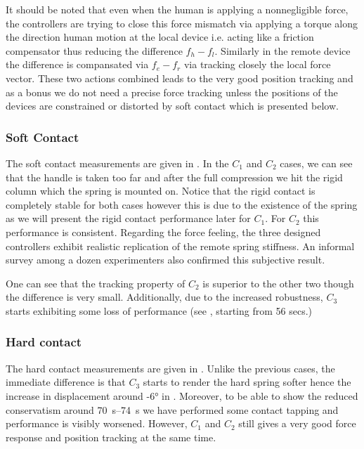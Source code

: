 It should be noted that even when the human is applying a nonnegligible force, the controllers are trying to close this force mismatch 
via applying a torque along the direction human motion at the local device i.e. acting like a friction compensator thus reducing the difference 
$f_h-f_l$. Similarly in the remote device the difference is compansated  via $f_e-f_r$ via tracking closely the local force vector. These two actions 
combined leads to the very good position tracking and as a bonus we do not need a precise force tracking unless the positions of the devices are 
constrained or distorted by soft contact which is presented below.



\subsubsection{Soft Contact}

The soft contact measurements are given in . In the $C_1$ and $C_2$ cases, 
we can see that the handle is taken too far and after the full compression we hit 
the rigid column which the spring is mounted on. Notice that the rigid contact is
completely stable for both cases however this is due to the existence of the spring 
as we will present the rigid contact performance later for $C_1$. For $C_2$ this 
performance is consistent. Regarding the force feeling, the three designed controllers
exhibit realistic replication of the remote spring stiffness. An informal survey among 
a dozen experimenters also confirmed this subjective result. 

One can see that the tracking property of $C_2$ is superior to the other two though the
difference is very small. Additionally, due to the increased robustness, $C_3$ starts
exhibiting some loss of performance (see , starting from 56 secs.)

\subsubsection{Hard contact}

The hard contact measurements are given in . Unlike the 
previous cases, the immediate difference is that $C_3$ starts to render the hard spring softer hence the increase in
displacement around \ang{-6} in . Moreover, to be able to show the reduced conservatism around 
\SIrange{70}{74}{\second} we have performed some contact tapping and performance is visibly worsened. However, $C_1$ and $C_2$ 
still gives a very good force response and position tracking at the same time. 

